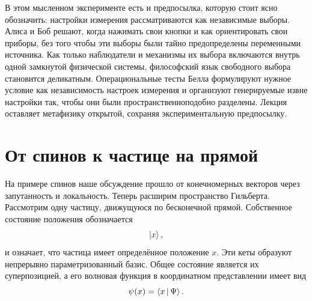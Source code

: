 \begin{classroomqa}
\end{classroomqa}

В этом мысленном эксперименте есть и предпосылка, которую стоит ясно обозначить: настройки измерения рассматриваются как независимые выборы. Алиса и Боб решают, когда нажимать свои кнопки и как ориентировать свои приборы, без того чтобы эти выборы были тайно предопределены переменными источника. Как только наблюдатели и механизмы их выбора включаются внутрь одной замкнутой физической системы, философский язык свободного выбора становится деликатным. Операциональные тесты Белла формулируют нужное условие как независимость настроек измерения и организуют генерируемые извне настройки так, чтобы они были пространственноподобно разделены. Лекция оставляет метафизику открытой, сохраняя экспериментальную предпосылку.

\begin{classroomqa}
\end{classroomqa}

\section{От спинов к частице на прямой}

На примере спинов наше обсуждение прошло от конечномерных векторов через запутанность и локальность. Теперь расширим пространство Гильберта. Рассмотрим одну частицу, движущуюся по бесконечной прямой. Собственное состояние положения обозначается
\begin{equation}
\left\lvert x\right\rangle,
\end{equation}
и означает, что частица имеет определённое положение \(x\). Эти кеты образуют непрерывно параметризованный базис. Общее состояние является их суперпозицией, а его волновая функция в координатном представлении имеет вид
\begin{equation}
\psi(x)=\left\langle x\,\middle|\,\Psi\right\rangle.
\label{eq:l8-position-wavefunction}
\end{equation}


